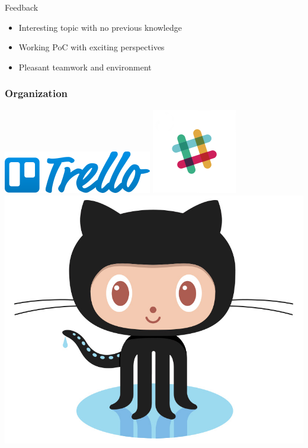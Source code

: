 
\begin{frame}{Feedback}
	\begin{itemize}
		\item Interesting topic with no previous knowledge
		\item Working PoC with exciting perspectives
		\item Pleasant teamwork and environment
	\end{itemize}
\end{frame}

\begin{frame}
	\frametitle{Organization}
	\begin{center}
		\includegraphics[scale=0.4]{figs/trello.png}
		\includegraphics[scale=0.4]{figs/slack.png}
		\includegraphics[scale=0.1]{figs/Octocat.jpg}
	\end{center}
\end{frame}


